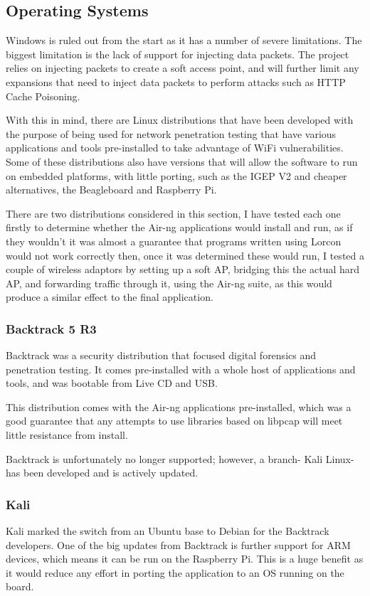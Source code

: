 \subsection{Operating Systems}
Windows is ruled out from the start as it has a number of severe limitations. The biggest limitation is the lack of support for injecting data packets. The project relies on injecting packets to create a soft access point, and will further limit any expansions that need to inject data packets to perform attacks such as HTTP Cache Poisoning.

With this in mind, there are Linux distributions that have been developed with the purpose of being used for network penetration testing that have various applications and tools pre-installed to take advantage of WiFi vulnerabilities. Some of these distributions also have versions that will allow the software to run on embedded platforms, with little porting, such as the IGEP V2 and cheaper alternatives, the Beagleboard and Raspberry Pi.

There are two distributions considered in this section, I have tested each one firstly to determine whether the Air-ng applications would install and run, as if they wouldn’t it was almost a guarantee that programs written using Lorcon would not work correctly then, once it was determined these would run, I tested a couple of wireless adaptors by setting up a soft AP, bridging this the actual hard AP, and forwarding traffic through it, using the Air-ng suite, as this would produce a similar effect to the final application.

\subsubsection{Backtrack 5 R3}
Backtrack was a security distribution that focused digital forensics and penetration testing. It comes pre-installed with a whole host of applications and tools, and was bootable from Live CD and USB. 

This distribution comes with the Air-ng applications pre-installed, which was a good guarantee that any attempts to use libraries based on libpcap will meet little resistance from install.

Backtrack is unfortunately no longer supported; however, a branch- Kali Linux- has been developed and is actively updated.
\subsubsection{Kali}
Kali marked the switch from an Ubuntu base to Debian for the Backtrack developers. One of the big updates from Backtrack is further support for ARM devices, which means it can be run on the Raspberry Pi. This is a huge benefit as it would reduce any effort in porting the application to an OS running on the board.
